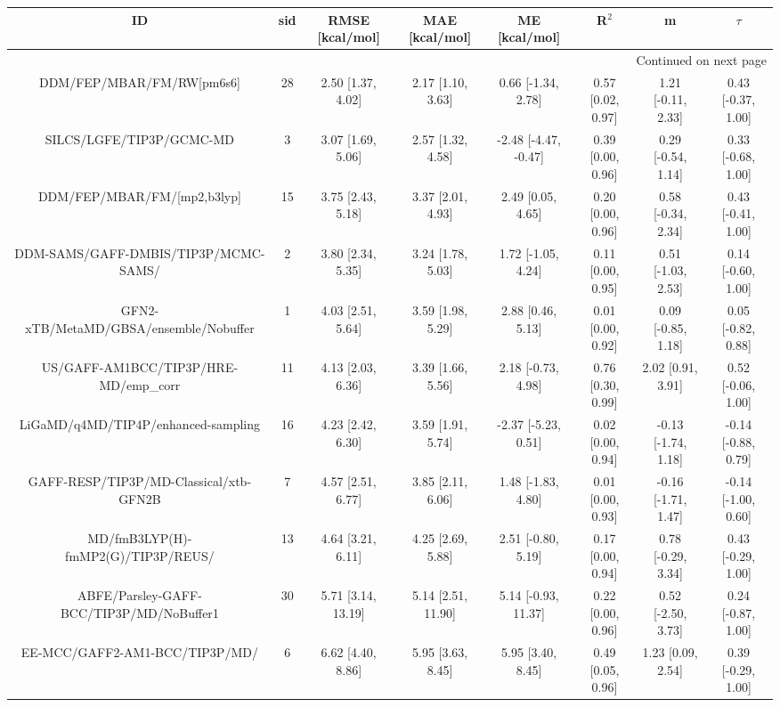\documentclass[8pt]{article}
\begin{document}
\begin{center}
\begin{footnotesize}
\begin{longtable}{|cccccccc|}
\toprule
                                       ID & sid &     RMSE [kcal/mol] &      MAE [kcal/mol] &         ME [kcal/mol] &              R$^2$ &                    m &               $\tau$ \\
\midrule
\endhead
\midrule
\multicolumn{8}{r}{{Continued on next page}} \\
\midrule
\endfoot

\bottomrule
\endlastfoot
                DDM/FEP/MBAR/FM/RW[pm6s6] &  28 &   2.50 [1.37, 4.02] &   2.17 [1.10, 3.63] &    0.66 [-1.34, 2.78] &  0.57 [0.02, 0.97] &   1.21 [-0.11, 2.33] &   0.43 [-0.37, 1.00] \\
                 SILCS/LGFE/TIP3P/GCMC-MD &   3 &   3.07 [1.69, 5.06] &   2.57 [1.32, 4.58] &  -2.48 [-4.47, -0.47] &  0.39 [0.00, 0.96] &   0.29 [-0.54, 1.14] &   0.33 [-0.68, 1.00] \\
              DDM/FEP/MBAR/FM/[mp2,b3lyp] &  15 &   3.75 [2.43, 5.18] &   3.37 [2.01, 4.93] &     2.49 [0.05, 4.65] &  0.20 [0.00, 0.96] &   0.58 [-0.34, 2.34] &   0.43 [-0.41, 1.00] \\
     DDM-SAMS/GAFF-DMBIS/TIP3P/MCMC-SAMS/ &   2 &   3.80 [2.34, 5.35] &   3.24 [1.78, 5.03] &    1.72 [-1.05, 4.24] &  0.11 [0.00, 0.95] &   0.51 [-1.03, 2.53] &   0.14 [-0.60, 1.00] \\
   GFN2-xTB/MetaMD/GBSA/ensemble/Nobuffer &   1 &   4.03 [2.51, 5.64] &   3.59 [1.98, 5.29] &     2.88 [0.46, 5.13] &  0.01 [0.00, 0.92] &   0.09 [-0.85, 1.18] &   0.05 [-0.82, 0.88] \\
    US/GAFF-AM1BCC/TIP3P/HRE-MD/emp\_corr &  11 &   4.13 [2.03, 6.36] &   3.39 [1.66, 5.56] &    2.18 [-0.73, 4.98] &  0.76 [0.30, 0.99] &    2.02 [0.91, 3.91] &   0.52 [-0.06, 1.00] \\
      LiGaMD/q4MD/TIP4P/enhanced-sampling &  16 &   4.23 [2.42, 6.30] &   3.59 [1.91, 5.74] &   -2.37 [-5.23, 0.51] &  0.02 [0.00, 0.94] &  -0.13 [-1.74, 1.18] &  -0.14 [-0.88, 0.79] \\
   GAFF-RESP/TIP3P/MD-Classical/xtb-GFN2B &   7 &   4.57 [2.51, 6.77] &   3.85 [2.11, 6.06] &    1.48 [-1.83, 4.80] &  0.01 [0.00, 0.93] &  -0.16 [-1.71, 1.47] &  -0.14 [-1.00, 0.60] \\
       MD/fmB3LYP(H)-fmMP2(G)/TIP3P/REUS/ &  13 &   4.64 [3.21, 6.11] &   4.25 [2.69, 5.88] &    2.51 [-0.80, 5.19] &  0.17 [0.00, 0.94] &   0.78 [-0.29, 3.34] &   0.43 [-0.29, 1.00] \\
 ABFE/Parsley-GAFF-BCC/TIP3P/MD/NoBuffer1 &  30 &  5.71 [3.14, 13.19] &  5.14 [2.51, 11.90] &   5.14 [-0.93, 11.37] &  0.22 [0.00, 0.96] &   0.52 [-2.50, 3.73] &   0.24 [-0.87, 1.00] \\
           EE-MCC/GAFF2-AM1-BCC/TIP3P/MD/ &   6 &   6.62 [4.40, 8.86] &   5.95 [3.63, 8.45] &     5.95 [3.40, 8.45] &  0.49 [0.05, 0.96] &    1.23 [0.09, 2.54] &   0.39 [-0.29, 1.00] \\
\end{longtable}
\end{footnotesize}
\end{center}
\end{document}
